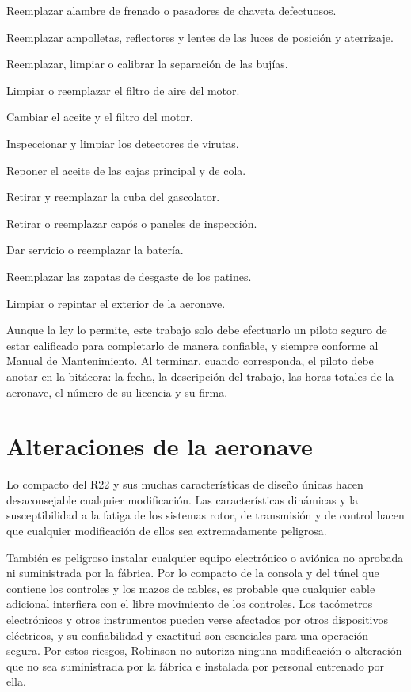 \begin{pasos}
\item Reemplazar alambre de frenado o pasadores de chaveta defectuosos.
\item Reemplazar ampolletas, reflectores y lentes de las luces de posición y aterrizaje.
\item Reemplazar, limpiar o calibrar la separación de las bujías.
\item Limpiar o reemplazar el filtro de aire del motor.
\item Cambiar el aceite y el filtro del motor.
\item Inspeccionar y limpiar los detectores de virutas.
\item Reponer el aceite de las cajas principal y de cola.
\item Retirar y reemplazar la cuba del gascolator.
\item Retirar o reemplazar capós o paneles de inspección.
\item Dar servicio o reemplazar la batería.
\item Reemplazar las zapatas de desgaste de los patines.
\item Limpiar o repintar el exterior de la aeronave.
\end{pasos}

Aunque la ley lo permite, este trabajo solo debe efectuarlo un piloto seguro de estar calificado para completarlo de manera confiable, y siempre conforme al Manual de Mantenimiento. Al terminar, cuando corresponda, el piloto debe anotar en la bitácora: la fecha, la descripción del trabajo, las horas totales de la aeronave, el número de su licencia y su firma.

\section{Alteraciones de la aeronave}

Lo compacto del R22 y sus muchas características de diseño únicas hacen desaconsejable cualquier modificación. Las características dinámicas y la susceptibilidad a la fatiga de los sistemas rotor, de transmisión y de control hacen que cualquier modificación de ellos sea extremadamente peligrosa.

También es peligroso instalar cualquier equipo electrónico o aviónica no aprobada ni suministrada por la fábrica. Por lo compacto de la consola y del túnel que contiene los controles y los mazos de cables, es probable que cualquier cable adicional interfiera con el libre movimiento de los controles. Los tacómetros electrónicos y otros instrumentos pueden verse afectados por otros dispositivos eléctricos, y su confiabilidad y exactitud son esenciales para una operación segura. Por estos riesgos, Robinson no autoriza ninguna modificación o alteración que no sea suministrada por la fábrica e instalada por personal entrenado por ella.

